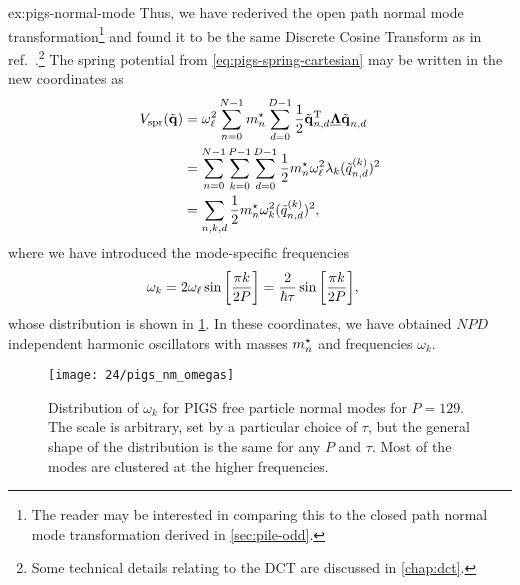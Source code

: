 \begin{DefAnswer}{ex:pigs-normal-mode}
	Thus, we have rederived the open path normal mode transformation\footnote{
		The reader may be interested in comparing this to the closed path normal mode transformation derived in \vref{sec:pile-odd}.
	} and found it to be the same Discrete Cosine Transform as in ref.~\cite{constable2012path}.\footnote{
		Some technical details relating to the DCT are discussed in \vref{chap:dct}.
	}
	The spring potential from \cref{eq:pigs-spring-cartesian} may be written in the new coordinates as
	\begin{subequations}
	\begin{align}
		V_\mathrm{spr}(\tilde{\bm{\mathbf{q}}})
		&= \omega_\ell^2 \sum_{n=0}^{N-1} {m}^\star_n \sum_{d=0}^{D-1} \frac{1}{2} \tilde{\bm{\mathbf{q}}}_{n,d}^\mathrm{T} \underline{\bm{\mathbf{\Lambda}}} \tilde{\bm{\mathbf{q}}}_{n,d} \\
		&= \sum_{n=0}^{N-1} \sum_{k=0}^{P-1} \sum_{d=0}^{D-1} \frac{1}{2} {m}^\star_n \omega_\ell^2 \lambda_k (\tilde{q}_{n,d}^{(k)})^2 \\
		&= \sum_{n,k,d} \frac{1}{2} {m}^\star_n \omega_k^2 (\tilde{q}_{n,d}^{(k)})^2,
	\end{align}
	\end{subequations}
	where we have introduced the mode-specific frequencies
	\begin{align}
		\omega_k
		&= 2 \omega_\ell \sin{\left[ \frac{\pi k}{2 P} \right]}
		= \frac{2}{\hbar \tau} \sin{\left[ \frac{\pi k}{2 P} \right]},
	\end{align}
	whose distribution is shown in \cref{fig:pigs-nm-omegas}.
	In these coordinates, we have obtained $N P D$ independent harmonic oscillators with masses ${m}^\star_n$ and frequencies $\omega_k$.

	\begin{figure}[H]
		\centering
		\texttt{[image: 24/pigs\_nm\_omegas]}
		\caption[
			PIGS normal mode frequency distribution
		]{
			Distribution of $\omega_k$ for PIGS free particle normal modes for $P = 129$.
			The scale is arbitrary, set by a particular choice of $\tau$, but the general shape of the distribution is the same for any $P$ and $\tau$.
			Most of the modes are clustered at the higher frequencies.
		}
		\label{fig:pigs-nm-omegas}
	\end{figure}


\end{DefAnswer}

